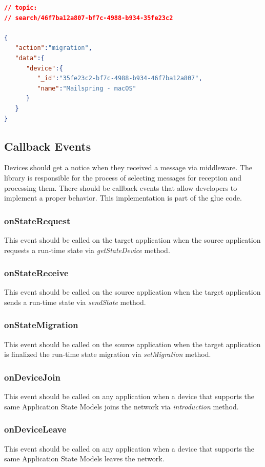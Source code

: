 \lstset{
  label=lis:api-setmigration,caption=K-9 Mail sends run-time state of search to Mailspring.
}
\begin{lstlisting}[language=json]
// topic:
// search/46f7ba12a807-bf7c-4988-b934-35fe23c2

{
   "action":"migration",
   "data":{
      "device":{
         "_id":"35fe23c2-bf7c-4988-b934-46f7ba12a807",
         "name":"Mailspring - macOS"
      }
   }
}
\end{lstlisting}

\subsection{Callback Events}
Devices should get a notice when they received a message via middleware. The library is responsible for the process of selecting messages for reception and processing them. There should be callback events that allow developers to implement a proper behavior. This implementation is part of the glue code.

\subsubsection{onStateRequest}
This event should be called on the target application when the source application requests a run-time state via \textit{getStateDevice} method.

\subsubsection{onStateReceive}
This event should be called on the source application when the target application sends a run-time state via \textit{sendState} method.

\subsubsection{onStateMigration}
This event should be called on the source application when the target application is finalized the run-time state migration via \textit{setMigration} method.

\subsubsection{onDeviceJoin}
This event should be called on any application when a device that supports the same Application State Models joins the network via \textit{introduction} method.

\subsubsection{onDeviceLeave}
This event should be called on any application when a device that supports the same Application State Models leaves the network.


